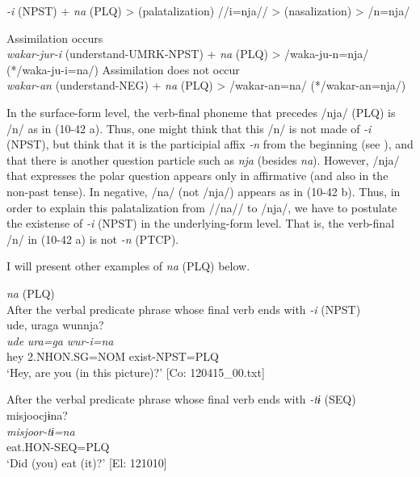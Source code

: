 \begin{xlist}
\begin{exe}
\ex\label{ex:10.41}
\textit{{}-i} (NPST)  +  \textit{na}  (PLQ)  >  (palatalization)  //i=nja//  >  (nasalization)  >  /n=nja/

\ex\label{ex:10.42}
\begin{xlist}
\ex Assimilation occurs\\
  \textit{wakar-jur-i}  (understand-UMRK{}-NPST)  +  \textit{na}  (PLQ)  >  /waka-ju-n=nja/  (*/waka-ju-i=na/)
\ex Assimilation does not occur\\
  \textit{wakar-an}  (understand-NEG)  +  \textit{na}  (PLQ)  >  /wakar-an=na/  (*/wakar-an=nja/)
\end{xlist}
\end{exe}

In the surface-form level, the verb-final phoneme that precedes /nja/ (PLQ) is /n/ as in (10-42 a). Thus, one might think that this /n/ is not made of \textit{{}-i} (NPST), but think that it is the participial affix \textit{{}-n} from the beginning (see ), and that there is another question particle such as \textit{nja} (besides \textit{na}). However, /nja/ that expresses the polar question appears only in affirmative (and also in the non-past tense). In negative, /na/ (not /nja/) appears as in (10-42 b). Thus, in order to explain this palatalization from //na// to /nja/, we have to postulate the existense of \textit{-i} (NPST) in the underlying-form level. That is, the verb-final /n/ in (10-42 a) is not \textit{{}-n} (PTCP).

  I will present other examples of \textit{na} (PLQ) below.

\ea\label{ex:10.43}   \textit{na} (PLQ)\\
  \ea After the verbal predicate phrase whose final verb ends with \textit{{}-i} (NPST)\\
      \glll    ude,  uraga  wunnja?\\
    \textit{ude}  \textit{ura=ga}  \textit{wur-i=na}\\
    hey  2.NHON.SG=NOM  exist-NPST=PLQ\\
\glt     ‘Hey, are you (in this picture)?’  [Co: 120415\_00.txt]

  \ex After the verbal predicate phrase whose final verb ends with \textit{{}-tɨ} (SEQ)\\
      \glll    misjoocjɨna?\\
    \textit{misjoor-tɨ=na}\\
    eat.HON-SEQ=PLQ\\
    \glt     ‘Did (you) eat (it)?’ [El: 121010]


\end{xlist}
